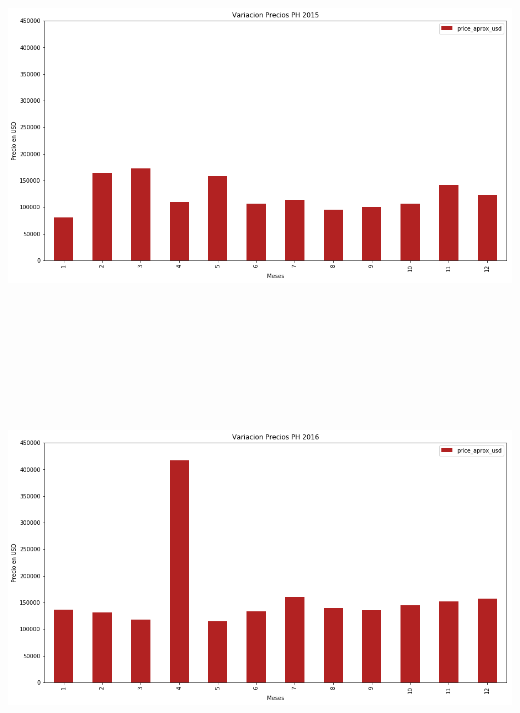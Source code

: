 \documentclass[a4paper, 10pt]{article}
\begin{document}
    \begin{center}
          \includegraphics[width=6in, height=4.2in]{images/vPH2015}
    \end{center}
    \begin{center}
          \includegraphics[width=6in, height=4.2in]{images/vPH2016}
    \end{center}
\end{document}
